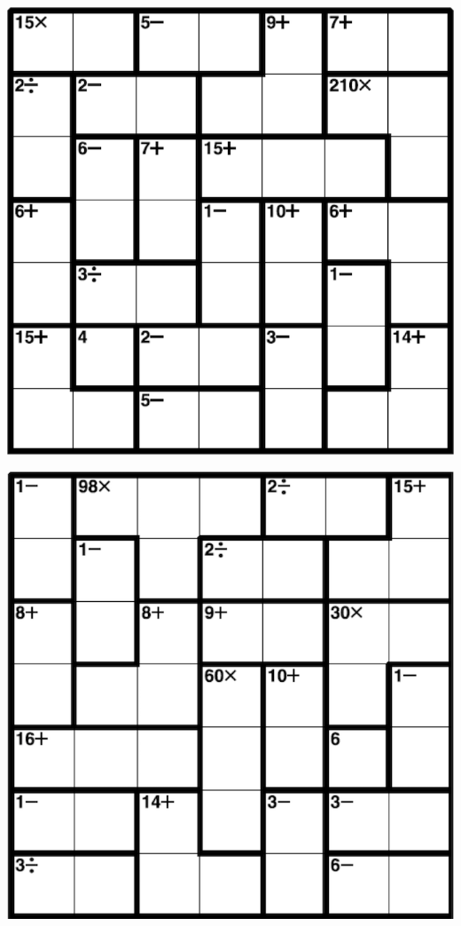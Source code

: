 
\includegraphics[scale=1]{Gambar/Lampiran/7x7_3.png}

\includegraphics[scale=1]{Gambar/Lampiran/7x7_4.png}

